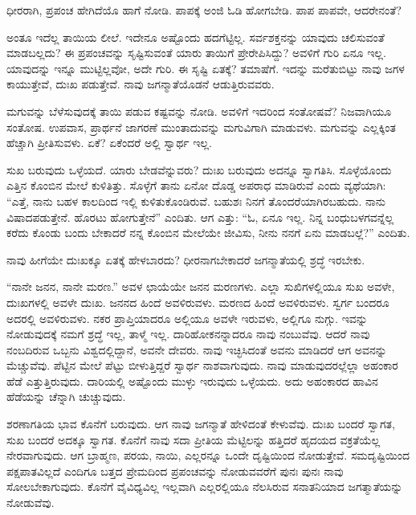 ಧೀರರಾಗಿ, ಪ್ರಪಂಚ ಹೇಗಿದೆಯೊ ಹಾಗೆ ನೋಡಿ. ಪಾಪಕ್ಕೆ ಅಂಜಿ ಓಡಿ ಹೋಗಬೇಡಿ. ಪಾಪ ಪಾಪವೇ, ಆದರೇನಂತೆ?

ಅಂತೂ ಇದೆಲ್ಲ ತಾಯಿಯ ಲೀಲೆ. ಇದೇನೂ ಅಷ್ಟೊಂದು ಹದಗೆಟ್ಟಿಲ್ಲ. ಸರ್ವಶಕ್ತನನ್ನು ಯಾವುದು ಚಲಿಸುವಂತೆ ಮಾಡಬಲ್ಲದು? ಈ ಪ್ರಪಂಚವನ್ನು ಸೃಷ್ಟಿಸುವಂತೆ ಯಾರು ತಾಯಿಗೆ ಪ್ರೇರೇಪಿಸಿದ್ದು? ಅವಳಿಗೆ ಗುರಿ ಏನೂ ಇಲ್ಲ. ಯಾವುದನ್ನು ಇನ್ನೂ ಮುಟ್ಟಿಲ್ಲವೋ, ಅದೇ ಗುರಿ. ಈ ಸೃಷ್ಟಿ ಏತಕ್ಕೆ? ತಮಾಷೆಗೆ. ಇದನ್ನು ಮರೆತುಬಿಟ್ಟು ನಾವು ಜಗಳ ಕಾಯುತ್ತೇವೆ, ದುಃಖ ಪಡುತ್ತೇವೆ. ನಾವು ಜಗನ್ಮಾತೆಯೊಡನೆ ಆಡುತ್ತಿರುವವರು.

ಮಗುವನ್ನು ಬೆಳೆಸುವುದಕ್ಕೆ ತಾಯಿ ಪಡುವ ಕಷ್ಟವನ್ನು ನೋಡಿ. ಅವಳಿಗೆ ಇದರಿಂದ ಸಂತೋಷವೆ? ನಿಜವಾಗಿಯೂ ಸಂತೋಷ. ಉಪವಾಸ, ಪ್ರಾರ್ಥನೆ ಜಾಗರಣೆ ಮುಂತಾದುವನ್ನು ಮಗುವಿಗಾಗಿ ಮಾಡುವಳು. ಮಗುವನ್ನು ಎಲ್ಲಕ್ಕಿಂತ ಹೆಚ್ಚಾಗಿ ಪ್ರೀತಿಸುವಳು. ಏಕೆ? ಏಕೆಂದರೆ ಅಲ್ಲಿ ಸ್ವಾರ್ಥ ಇಲ್ಲ.

ಸುಖ ಬರುವುದು ಒಳ್ಳೆಯದೆ. ಯಾರು ಬೇಡವೆನ್ನುವರು? ದುಃಖ ಬರುವುದು ಅದನ್ನೂ ಸ್ವಾಗತಿಸಿ. ಸೊಳ್ಳೆಯೊಂದು ಎತ್ತಿನ ಕೊಂಬಿನ ಮೇಲೆ ಕುಳಿತಿತ್ತು. ಸೊಳ್ಳೆಗೆ ತಾನು ಏನೋ ದೊಡ್ಡ ಅಪರಾಧ ಮಾಡಿರುವೆ ಎಂದು ವ್ಯಥೆಯಾಗಿ: “ಎತ್ತೆ, ನಾನು ಬಹಳ ಕಾಲದಿಂದ ಇಲ್ಲಿ ಕುಳಿತುಕೊಂಡಿರುವೆ. ಬಹುಶಃ ನಿನಗೆ ತೊಂದರೆಯಾಗಿರಬಹುದು. ನಾನು ವಿಷಾದಪಡುತ್ತೇನೆ. ಹೊರಟು ಹೋಗುತ್ತೇನೆ” ಎಂದಿತು. ಆಗ ಎತ್ತು: “ಓ, ಏನೂ ಇಲ್ಲ. ನಿನ್ನ ಬಂಧುಬಳಗವನ್ನೆಲ್ಲ ಕರೆದು ಕೊಂಡು ಬಂದು ಬೇಕಾದರೆ ನನ್ನ ಕೊಂಬಿನ ಮೇಲೆಯೇ ಜೀವಿಸು, ನೀನು ನನಗೆ ಏನು ಮಾಡಬಲ್ಲೆ?” ಎಂದಿತು.

ನಾವು ಹೀಗೆಯೇ ದುಃಖಕ್ಕೂ ಏತಕ್ಕೆ ಹೇಳಬಾರದು? ಧೀರನಾಗಬೇಕಾದರೆ ಜಗನ್ಮಾತೆಯಲ್ಲಿ ಶ್ರದ್ಧೆ ಇರಬೇಕು.

“ನಾನೇ ಜನನ, ನಾನೇ ಮರಣ.” ಅವಳ ಛಾಯೆಯೇ ಜನನ ಮರಣಗಳು. ಎಲ್ಲಾ ಸುಖಿಗಳಲ್ಲಿಯೂ ಸುಖ ಅವಳೇ, ದುಃಖಗಳಲ್ಲಿ ಅವಳೇ ದುಃಖ. ಜನನದ ಹಿಂದೆ ಅವಳಿರುವಳು. ಮರಣದ ಹಿಂದೆ ಅವಳಿರುವಳು. ಸ್ವರ್ಗ ಬಂದರೂ ಅದರಲ್ಲಿ ಅವಳಿರುವಳು. ನಕರ ಪ್ರಾಪ್ತಿಯಾದರೂ ಅಲ್ಲಿಯೂ ಅವಳೇ ಇರುವಳು, ಅಲ್ಲಿಗೂ ನುಗ್ಗು. ಇವನ್ನು ನೋಡುವುದಕ್ಕೆ ನಮಗೆ ಶ್ರದ್ಧೆ ಇಲ್ಲ, ತಾಳ್ಮೆ ಇಲ್ಲ. ದಾರಿಹೋಕನನ್ನಾದರೂ ನಾವು ನಂಬುವೆವು. ಆದರೆ ನಾವು ನಂಬದಿರುವ ಒಬ್ಬನು ವಿಶ್ವದಲ್ಲಿದ್ದಾನೆ, ಅವನೇ ದೇವರು. ನಾವು ಇಚ್ಛಿಸಿದಂತೆ ಅವನು ಮಾಡಿದರೆ ಆಗ ಅವನನ್ನು ಮೆಚ್ಚುವೆವು. ಪೆಟ್ಟಿನ ಮೇಲೆ ಪೆಟ್ಟು ಬೀಳುತ್ತಿದ್ದರೆ ಸ್ವಾರ್ಥ ನಾಶವಾಗುವುದು. ನಾವು ಮಾಡುವುದರಲ್ಲೆಲ್ಲಾ ಅಹಂಕಾರ ಹೆಡೆ ಎತ್ತುತ್ತಿರುವುದು. ದಾರಿಯಲ್ಲಿ ಅಷ್ಟೊಂದು ಮುಳ್ಳು ಇರುವುದು ಒಳ್ಳೆಯದು. ಅದು ಅಹಂಕಾರದ ಹಾವಿನ ಹೆಡೆಯನ್ನು ಚೆನ್ನಾಗಿ ಚುಚ್ಚುವುದು.

ಶರಣಾಗತಿಯ ಭಾವ ಕೊನೆಗೆ ಬರುವುದು. ಆಗ ನಾವು ಜಗನ್ಮಾತೆ ಹೇಳಿದಂತೆ ಕೇಳುವೆವು. ದುಃಖ ಬಂದರೆ ಸ್ವಾಗತ, ಸುಖ ಬಂದರೆ ಅದಕ್ಕೂ ಸ್ವಾಗತ. ಕೊನೆಗೆ ನಾವು ಸದಾ ಪ್ರೀತಿಯ ಮೆಟ್ಟಿಲನ್ನು ಹತ್ತಿದರೆ ಹೃದಯದ ವಕ್ರತೆಯೆಲ್ಲ ನೇರವಾಗುವುದು. ಆಗ ಬ್ರಾಹ್ಮಣ, ಪರಯ, ನಾಯಿ, ಎಲ್ಲರನ್ನೂ ಒಂದೇ ದೃಷ್ಟಿಯಿಂದ ನೋಡುತ್ತೇವೆ. ಸಮದೃಷ್ಟಿಯಿಂದ ಪಕ್ಷಪಾತವಿಲ್ಲದೆ ಎಂದಿಗೂ ಬತ್ತದ ಪ್ರೇಮದಿಂದ ಪ್ರಪಂಚವನ್ನು ನೋಡುವವರೆಗೆ ಪುನಃ ಪುನಃ ನಾವು ಸೋಲಬೇಕಾಗುವುದು. ಕೊನೆಗೆ ವೈವಿಧ್ಯವಿಲ್ಲ ಇಲ್ಲವಾಗಿ ಎಲ್ಲರಲ್ಲಿಯೂ ನೆಲಸಿರುವ ಸನಾತನಿಯಾದ ಜಗತ್ಮಾತೆಯನ್ನು ನೋಡುವೆವು.

